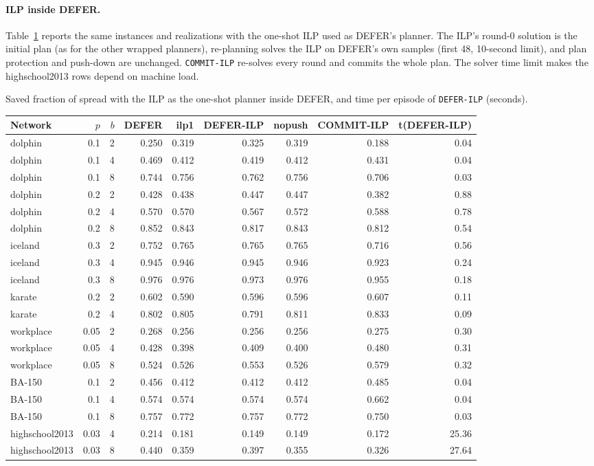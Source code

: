 \documentclass[ijoc,sglanonrev]{informs4}
\begin{document}
\paragraph{ILP inside DEFER.} Table~\ref{tab:defer-ilp} reports the same
instances and realizations with the one-shot ILP used as DEFER's planner. The
ILP's round-0 solution is the initial plan (as for the other wrapped planners),
re-planning solves the ILP on DEFER's own samples (first 48, 10-second limit),
and plan protection and push-down are unchanged. \texttt{COMMIT-ILP} re-solves
every round and commits the whole plan. The solver time limit makes the
highschool2013 rows depend on machine load.

\begin{table}[h]
\TABLE
{Saved fraction of spread with the ILP as the one-shot planner inside DEFER,
and time per episode of \texttt{DEFER-ILP} (seconds).\label{tab:defer-ilp}}
{\footnotesize
\begin{tabular}{lrrrrrrrr}
\hline
Network & $p$ & $b$ & DEFER & ilp1 & DEFER-ILP & nopush & COMMIT-ILP & t(DEFER-ILP)\\
\hline
dolphin & 0.1 & 2 & 0.250 & 0.319 & 0.325 & 0.319 & 0.188 & 0.04 \\
dolphin & 0.1 & 4 & 0.469 & 0.412 & 0.419 & 0.412 & 0.431 & 0.04 \\
dolphin & 0.1 & 8 & 0.744 & 0.756 & 0.762 & 0.756 & 0.706 & 0.03 \\
dolphin & 0.2 & 2 & 0.428 & 0.438 & 0.447 & 0.447 & 0.382 & 0.88 \\
dolphin & 0.2 & 4 & 0.570 & 0.570 & 0.567 & 0.572 & 0.588 & 0.78 \\
dolphin & 0.2 & 8 & 0.852 & 0.843 & 0.817 & 0.843 & 0.812 & 0.54 \\
iceland & 0.3 & 2 & 0.752 & 0.765 & 0.765 & 0.765 & 0.716 & 0.56 \\
iceland & 0.3 & 4 & 0.945 & 0.946 & 0.945 & 0.946 & 0.923 & 0.24 \\
iceland & 0.3 & 8 & 0.976 & 0.976 & 0.973 & 0.976 & 0.955 & 0.18 \\
karate & 0.2 & 2 & 0.602 & 0.590 & 0.596 & 0.596 & 0.607 & 0.11 \\
karate & 0.2 & 4 & 0.802 & 0.805 & 0.791 & 0.811 & 0.833 & 0.09 \\
workplace & 0.05 & 2 & 0.268 & 0.256 & 0.256 & 0.256 & 0.275 & 0.30 \\
workplace & 0.05 & 4 & 0.428 & 0.398 & 0.409 & 0.400 & 0.480 & 0.31 \\
workplace & 0.05 & 8 & 0.524 & 0.526 & 0.553 & 0.526 & 0.579 & 0.32 \\
BA-150 & 0.1 & 2 & 0.456 & 0.412 & 0.412 & 0.412 & 0.485 & 0.04 \\
BA-150 & 0.1 & 4 & 0.574 & 0.574 & 0.574 & 0.574 & 0.662 & 0.04 \\
BA-150 & 0.1 & 8 & 0.757 & 0.772 & 0.757 & 0.772 & 0.750 & 0.03 \\
highschool2013 & 0.03 & 4 & 0.214 & 0.181 & 0.149 & 0.149 & 0.172 & 25.36 \\
highschool2013 & 0.03 & 8 & 0.440 & 0.359 & 0.397 & 0.355 & 0.326 & 27.64 \\
\hline
\end{tabular}}{}
\end{table}
\end{document}
